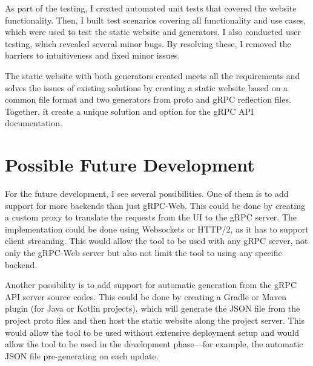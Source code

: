 As part of the testing, I created automated unit tests that covered the website functionality.
Then, I built test scenarios covering all functionality and use cases, which were used to test the static website and generators.
I also conducted user testing, which revealed several minor bugs.
By resolving these, I removed the barriers to intuitiveness and fixed minor issues.

The static website with both generators created meets all the requirements and solves the issues of existing solutions by creating a static website based on a common file format and two generators from proto and gRPC reflection files.
Together, it create a unique solution and option for the gRPC API documentation.


\section{Possible Future Development}
For the future development, I see several possibilities.
One of them is to add support for more backends than just gRPC-Web.
This could be done by creating a custom proxy to translate the requests from the UI to the gRPC server.
The implementation could be done using Websockets or HTTP/2, as it has to support client streaming.
This would allow the tool to be used with any gRPC server, not only the gRPC-Web server but also not limit the tool to using any specific backend.

Another possibility is to add support for automatic generation from the gRPC API server source codes.
This could be done by creating a Gradle or Maven plugin (for Java or Kotlin projects), which will generate the JSON file from the project proto files and then host the static website along the project server.
This would allow the tool to be used without extensive deployment setup and would allow the tool to be used in the development phase—for example, the automatic JSON file pre-generating on each update.